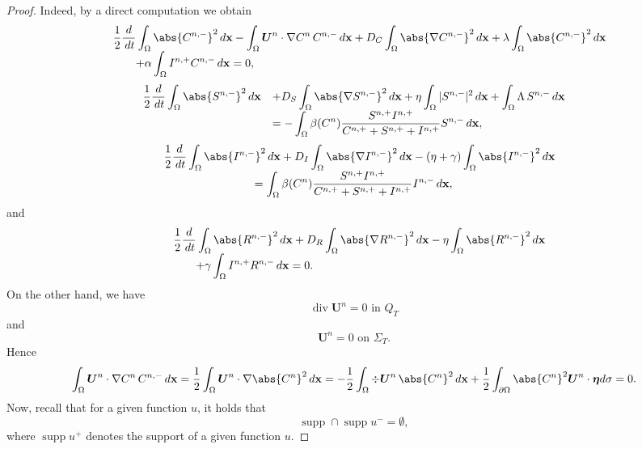 \documentclass[10pt,number,preprint,times]{elsarticle}
\numberwithin{equation}{section} %
\begin{document}
\begin{proof}
\noindent
Indeed, by a direct computation we obtain		
		\begin{eqnarray}\label{post-1}
			\begin{array}{ll}
				&\displaystyle\frac{1}{2}\frac{d}{\,dt}\int_\Omega \abs{C^{n,-}}^2  \, d\mathbf{x}
				- \int_\Omega \boldsymbol{U}^n \cdot\nabla C^n \, C^{n,-}  \, d\mathbf{x}
				+D_C\int_\Omega \abs{\nabla C^{n,-}}^2 \, d\mathbf{x}+\lambda\int_{\Omega} \abs{C^{n,-}}^2\, d\mathbf{x}\\
				& \displaystyle\qquad +\alpha\int_\Omega I^{n,+} C^{n,-}  \, d\mathbf{x}=0,
			\end{array}
		\end{eqnarray} 
		\begin{eqnarray}\label{post-2}
			\begin{array}{ll}\displaystyle
				\displaystyle\frac{1}{2}\frac{d}{\,dt}\int_\Omega \abs{S^{n,-}}^2  \, d\mathbf{x}
				&+\displaystyle D_S\int_\Omega \abs{\nabla S^{n,-}}^2 \, d\mathbf{x}+ \displaystyle \eta\int_\Omega |S^{n,-}|^2\, d\mathbf{x}+\int_\Omega \Lambda\, S^{n,-}\, d\mathbf{x}\\
				&\displaystyle=-\int_\Omega \beta(C^n) \frac{S^{n,+} I^{n,+}}{C^{n,+}+S^{n,+}+I^{n,+}} S^{n,-}  \, d\mathbf{x},
		\end{array}\end{eqnarray} 
		\begin{eqnarray}\label{post-3}
			\begin{array}{ll}
				&\displaystyle\frac{1}{2}\frac{d}{\,dt}\int_\Omega \abs{I^{n,-}}^2  \, d\mathbf{x}
				
				+D_I\int_\Omega \abs{\nabla I^{n,-}}^2 \, d\mathbf{x}-(\eta+\gamma)\int_\Omega \abs{I^{n,-}}^2  \, d\mathbf{x}\\
				& \displaystyle\qquad \qquad \qquad \qquad=\int_\Omega \beta(C^n) \frac{S^{n,+} I^{n,+}}{C^{n,+}+S^{n,+}+I^{n,+}} I^{n,-}  \, d\mathbf{x},
		\end{array}\end{eqnarray}
	and
			\begin{eqnarray}\label{post-4}
		\begin{array}{ll}
			&\displaystyle\frac{1}{2}\frac{d}{\,dt}\int_\Omega \abs{R^{n,-}}^2  \, d\mathbf{x}
			+D_R\int_\Omega \abs{\nabla R^{n,-}}^2 \, d\mathbf{x}-\eta\int_{\Omega} \abs{R^{n,-}}^2\, d\mathbf{x}\\
			& \displaystyle\qquad +\gamma\int_\Omega I^{n,+} R^{n,-}  \, d\mathbf{x}=0.
		\end{array}
	\end{eqnarray} 
	On the other hand, we have
$$\operatorname{div}\boldsymbol{U}^n=0 \text{ in } Q_T$$ 
and 
$$\boldsymbol{U}^n=0 \text{ on } \Sigma_T.$$ 
Hence
$$
\int_\Omega \boldsymbol{U}^n \cdot\nabla C^n\, C^{n,-}  \, d\mathbf{x}
=\frac{1}{2}\int_\Omega \boldsymbol{U}^n \cdot \nabla  \abs{C^n}^2\, d\mathbf{x}
=-\frac{1}{2}\int_\Omega \div \boldsymbol{U}^n \, \abs{C^n}^2\, d\mathbf{x}
+\frac{1}{2}\int_{\partial \Omega}\abs{C^n}^2  \boldsymbol{U}^n \cdot \boldsymbol{\eta} d\sigma=0.
$$
Now, recall that for a given function $u$, it holds that
		$$
		\operatorname{supp} \cap \operatorname{supp}{u^-}=\emptyset,
		$$
		where $\operatorname{supp}{u^+}$ denotes the support of a given function $u$.
		

\end{proof}
\end{document}
